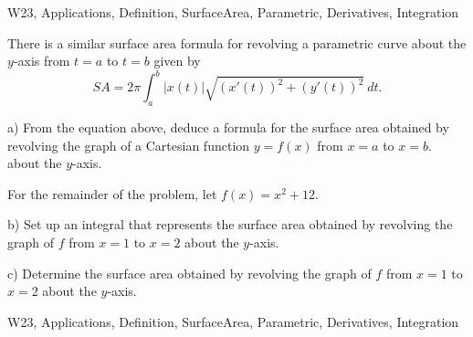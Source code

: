 \begin{tagblock}{W23, Applications, Definition, SurfaceArea, Parametric, Derivatives, Integration}
\begin{question}
	
There is a similar surface area formula for revolving a parametric curve about the $y$-axis from $t=a$ to $t=b$ given by
\[
SA=2\pi\int_a^b|x(t)|\sqrt{(x'(t))^2+(y'(t))^2} \ dt.
\]

\bigskip

a) From the equation above, deduce a formula for the surface area obtained by revolving the graph of a Cartesian function $y=f(x)$ from $x=a$ to $x=b$. about the $y$-axis.

\bigskip

For the remainder of the problem, let $f(x)=x^2+12$.

\bigskip

b) Set up an integral that represents the surface area obtained by revolving the graph of $f$ from $x=1$ to $x=2$ about the $y$-axis. 

\bigskip

c) Determine the surface area obtained by revolving the graph of $f$ from $x=1$ to $x=2$ about the $y$-axis.

    
\begin{tags}
        W23, Applications, Definition, SurfaceArea, Parametric, Derivatives, Integration
\end{tags}
    
\begin{diary}
\end{diary}
	
\begin{solution}

\end{solution}
	
\end{question}

\end{tagblock}

